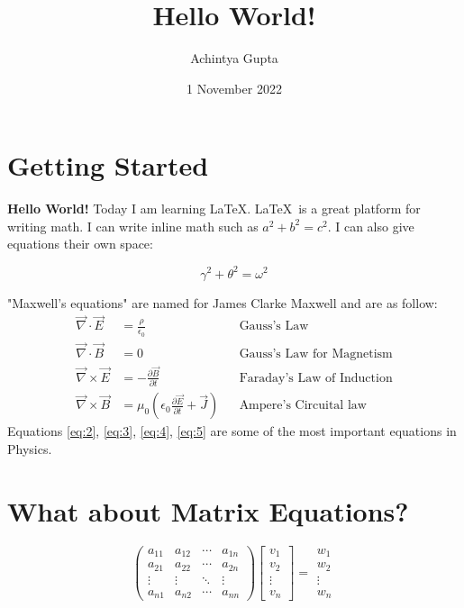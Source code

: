 \documentclass[12pt]{article}
\title{Hello World!}
\author{Achintya Gupta}
\date{1 November 2022}
\begin{document}
\maketitle

\section{Getting Started}
\textbf{Hello World!} Today I am learning \LaTeX. \LaTeX\ is a great platform for writing math. I can write inline math such as $a^2 + b^2 = c^2$. I can also give equations their own space: 

\begin{equation}
  \gamma^2 + \theta^2 = \omega^2  
\end{equation}

"Maxwell's equations" are named for James Clarke Maxwell and are as follow:
\begin{align*}
\vec\nabla\cdot\vec{E} &= \frac{\rho}{\epsilon_0} & &\textrm{Gauss's Law}\label{eq:2}\tag{2}  \\
\vec\nabla\cdot\vec{B} &= 0& &\textrm{Gauss's Law for Magnetism}\label{eq:3}\tag{3}\\
\vec\nabla \times \vec{E} &= -\frac{\partial\vec{B}}{\partial t} & &\textrm{Faraday's Law of Induction}\label{eq:4}\tag{4}\\
\vec\nabla \times \vec{B} &= \mu_0\left( \epsilon_0\frac{\partial\vec{E}}{\partial t} + \vec{J} \right) & &\textrm{Ampere's Circuital law}\label{eq:5}\tag{5}
\end{align*}
Equations \ref{eq:2}, \ref{eq:3}, \ref{eq:4}, \ref{eq:5} are some of the most important equations in Physics.

\section{What about Matrix Equations?}
\begin{equation*}
\begin{pmatrix}
a_{11} & a_{12} & \cdots & a_{1n} \\
a_{21} & a_{22} & \cdots & a_{2n} \\
\vdots  & \vdots  & \ddots & \vdots  \\
a_{n1} & a_{n2} & \cdots & a_{nn} 
\end{pmatrix}
\begin{bmatrix}
v_1 \\
v_2 \\
\vdots \\
v_n
\end{bmatrix}
=
\begin{matrix}
w_1 \\
w_2 \\
\vdots \\
w_n
\end{matrix}
\end{equation*}
\end{document}
